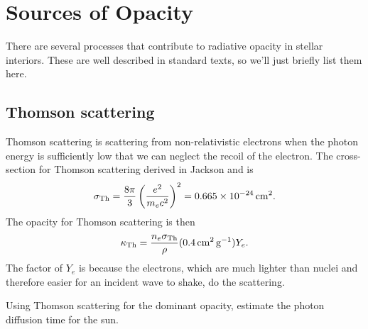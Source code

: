 \section{Sources of Opacity}\label{s.opacity-sources}

There are several processes that contribute to radiative opacity in stellar interiors.  These are well described in standard texts, so we'll just briefly list them here.

\subsection{Thomson scattering}
Thomson scattering is scattering from non-relativistic electrons when the photon energy is sufficiently low that we can neglect the recoil of the electron.  The cross-section for Thomson scattering derived in Jackson and is 
\begin{equation}\label{e.Thomson-cross-section}
\sigma_{\mathrm{Th}} = \frac{8\pi}{3}\left(\frac{e^{2}}{m_{e}c^{2}}\right)^{2} = 0.665 \times 10^{-24} \,\mathrm{c}\mathrm{m}^{2}.
\end{equation}
The opacity for Thomson scattering is then
\[ \kappa_{\mathrm{Th}} = \frac{n_{e}\sigma_{\mathrm{Th}}}{\rho} (0.4\,\mathrm{c}\mathrm{m}^{2}\,\mathrm{g}^{-1}) Y_{e}. \]
The factor of $Y_{e}$ is because the electrons, which are much lighter than nuclei and therefore easier for an incident wave to shake, do the scattering.

\begin{exercisebox}
Using Thomson scattering for the dominant opacity, estimate the photon diffusion time for the sun. 
\end{exercisebox}

